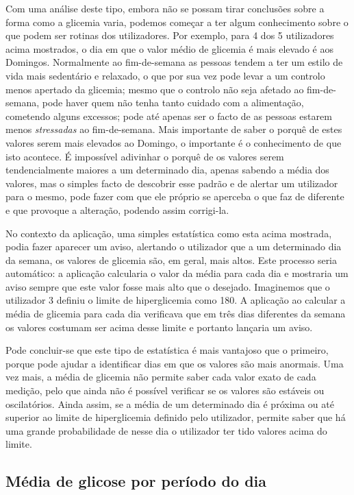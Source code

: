 Com uma análise deste tipo, embora não se possam tirar conclusões sobre a forma como a glicemia varia, podemos começar a ter algum conhecimento sobre o que podem ser rotinas dos utilizadores. Por exemplo, para 4 dos 5 utilizadores acima mostrados, o dia em que o valor médio de glicemia é mais elevado é aos Domingos. Normalmente ao fim-de-semana as pessoas tendem a ter um estilo de vida mais sedentário e relaxado, o que por sua vez pode levar a um controlo menos apertado da glicemia; mesmo que o controlo não seja afetado ao fim-de-semana, pode haver quem não tenha tanto cuidado com a alimentação, cometendo alguns excessos; pode até apenas ser o facto de as pessoas estarem menos \textit{stressadas} ao fim-de-semana. Mais importante de saber o porquê de estes valores serem mais elevados ao Domingo, o importante é o conhecimento de que isto acontece. É impossível adivinhar o porquê de os valores serem tendencialmente maiores a um determinado dia, apenas sabendo a média dos valores, mas o simples facto de descobrir esse padrão e de alertar um utilizador para o mesmo, pode fazer com que ele próprio se aperceba o que faz de diferente e que provoque a alteração, podendo assim corrigi-la. 

No contexto da aplicação, uma simples estatística como esta acima mostrada, podia fazer aparecer um aviso, alertando o utilizador que a um determinado dia da semana, os valores de glicemia são, em geral, mais altos. Este processo seria automático: a aplicação calcularia o valor da média para cada dia e mostraria um aviso sempre que este valor fosse mais alto que o desejado. Imaginemos que o utilizador 3 definiu o limite de hiperglicemia como 180. A aplicação ao calcular a média de glicemia para cada dia verificava que em três dias diferentes da semana os valores costumam ser acima desse limite e portanto lançaria um aviso.\newline

Pode concluir-se que este tipo de estatística é mais vantajoso que o primeiro, porque pode ajudar a identificar dias em que os valores são mais anormais. Uma vez mais, a média de glicemia não permite saber cada valor exato de cada medição, pelo que ainda não é possível verificar se os valores são estáveis ou oscilatórios. Ainda assim, se a média de um determinado dia é próxima ou até superior ao limite de hiperglicemia definido pelo utilizador, permite saber que há uma grande probabilidade de nesse dia o utilizador ter tido valores acima do limite.

\subsection{Média de glicose por período do dia}

